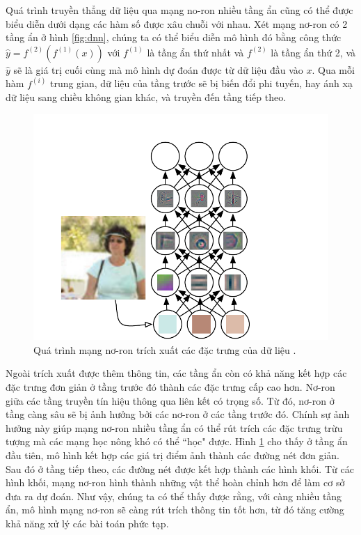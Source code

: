 Quá trình truyền thẳng dữ liệu qua mạng no-ron nhiều tầng ẩn cũng có thể được biểu diễn dưới dạng các hàm số được xâu chuỗi với nhau. Xét mạng nơ-ron có 2 tầng ẩn ở hình \ref{fig:dnn}, chúng ta có thể biểu diễn mô hình đó bằng công thức $\hat{y}=f^{(2)}(f^{(1)}(x))$ với $f^{(1)}$ là tầng ẩn thứ nhất và $f^{(2)}$ là tầng ẩn thứ 2, và $\hat{y}$ sẽ là giá trị cuối cùng mà mô hình dự đoán được từ dữ liệu đầu vào $x$. Qua mỗi hàm $f^{(i)}$ trung gian, dữ liệu của tầng trước sẽ bị biến đổi phi tuyến, hay ánh xạ dữ liệu sang chiều không gian khác, và truyền đến tầng tiếp theo.

\begin{figure}[H]
	\centering
	\includegraphics[width=160 mm]{images/dnn-features.png}
	\caption{Quá trình mạng nơ-ron trích xuất các đặc trưng của dữ liệu \cite{goodfellow2016deeplearning}.}
	\label{fig:dnn-features}
\end{figure}

Ngoài trích xuất được thêm thông tin, các tầng ẩn còn có khả năng kết hợp các đặc trưng đơn giản ở tầng trước đó thành các đặc trưng cấp cao hơn. Nơ-ron giữa các tầng truyền tín hiệu thông qua liên kết có trọng số. Từ đó, nơ-ron ở tầng càng sâu sẽ bị ảnh hưởng bởi các nơ-ron ở các tầng trước đó. Chính sự ảnh hưởng này giúp mạng nơ-ron nhiều tầng ẩn có thể rút trích các đặc trưng trừu tượng mà các mạng học nông khó có thể ``học" được. Hình \ref{fig:dnn-features} cho thấy ở tầng ẩn đầu tiên, mô hình kết hợp các giá trị điểm ảnh thành các đường nét đơn giản. Sau đó ở tầng tiếp theo, các đường nét được kết hợp thành các hình khối. Từ các hình khối, mạng nơ-ron hình thành những vật thể hoàn chỉnh hơn để làm cơ sở đưa ra dự đoán. Như vậy, chúng ta có thể thấy được rằng, với càng nhiều tầng ẩn, mô hình mạng nơ-ron sẽ càng rút trích thông tin tốt hơn, từ đó tăng cường khả năng xử lý các bài toán phức tạp.

